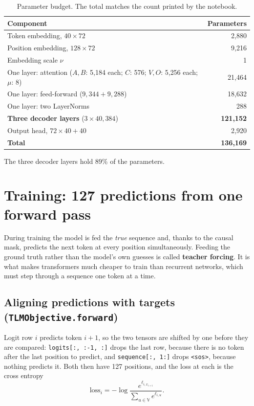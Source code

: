 \documentclass[11pt]{article}
\newcommand{\tok}[1]{\texttt{<#1>}}
\newcommand{\code}[1]{\texttt{#1}}
\newcommand{\V}{\mathbb{V}}
\begin{document}
\begin{table}[h]
\centering\small
\caption{Parameter budget. The total matches the count printed by the notebook.}
\label{tab:params}
\begin{tabular}{@{}lr@{}}
\toprule
Component & Parameters \\
\midrule
Token embedding, $40\times72$ & 2{,}880 \\
Position embedding, $128\times72$ & 9{,}216 \\
Embedding scale $\nu$ & 1 \\
One layer: attention ($A,B$: 5{,}184 each; $C$: 576; $V,O$: 5{,}256 each; $\mu$: 8) & 21{,}464 \\
One layer: feed-forward ($9{,}344+9{,}288$) & 18{,}632 \\
One layer: two LayerNorms & 288 \\
\textbf{Three decoder layers} ($3\times40{,}384$) & \textbf{121{,}152} \\
Output head, $72\times40+40$ & 2{,}920 \\
\midrule
\textbf{Total} & \textbf{136{,}169} \\
\bottomrule
\end{tabular}
\end{table}

\noindent The three decoder layers hold 89\% of the parameters.

\section{Training: 127 predictions from one forward pass}

During training the model is fed the \emph{true} sequence and, thanks to the causal
mask, predicts the next token at every position simultaneously. Feeding the ground
truth rather than the model's own guesses is called \textbf{teacher forcing}. It is
what makes transformers much cheaper to train than recurrent networks, which must step
through a sequence one token at a time.

\subsection{Aligning predictions with targets (\code{TLMObjective.forward})}

Logit row $i$ predicts token $i+1$, so the two tensors are shifted by one before they
are compared: \code{logits[:, :-1, :]} drops the last row, because there is no token
after the last position to predict, and \code{sequence[:, 1:]} drops \tok{sos}, because nothing predicts it.
Both then have 127 positions, and the loss at each is the cross entropy
\begin{equation}
  \mathrm{loss}_i=-\log\frac{e^{\ell_{i,x_{i+1}}}}{\sum_{u\in\V}e^{\ell_{i,u}}} .
\end{equation}
\end{document}
